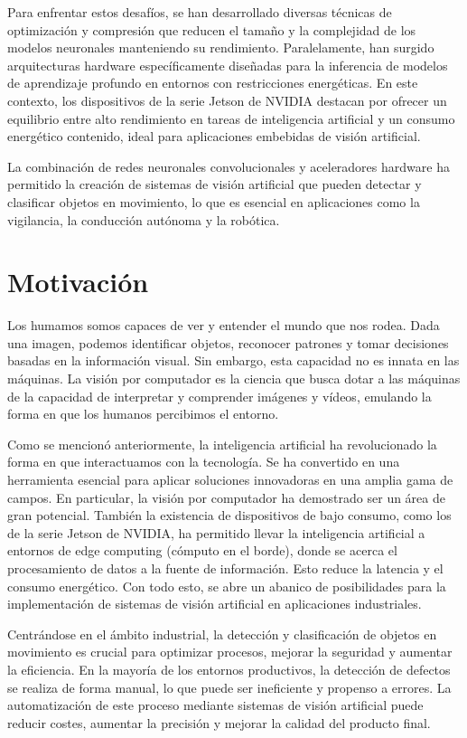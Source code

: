 \documentclass[11pt,spanish,listoffigures,listoftables]{tfgetsinf}
\begin{document}
Para enfrentar estos desafíos, se han desarrollado diversas técnicas de optimización y compresión que reducen el tamaño y la complejidad de los modelos neuronales manteniendo su rendimiento. Paralelamente, han surgido arquitecturas hardware específicamente diseñadas para la inferencia de modelos de aprendizaje profundo en entornos con restricciones energéticas. En este contexto, los dispositivos de la serie Jetson de NVIDIA\cite{nvidia_jetson_modules} destacan por ofrecer un equilibrio entre alto rendimiento en tareas de inteligencia artificial y un consumo energético contenido, ideal para aplicaciones embebidas de visión artificial.

La combinación de redes neuronales convolucionales y aceleradores hardware ha permitido la creación de sistemas de visión artificial que pueden detectar y clasificar objetos en movimiento, lo que es esencial en aplicaciones como la vigilancia, la conducción autónoma y la robótica.

\section{Motivaci\'on} \label{sec:motivacion}

Los humamos somos capaces de ver y entender el mundo que nos rodea. Dada una imagen, podemos identificar objetos, reconocer patrones y tomar decisiones basadas en la información visual. Sin embargo, esta capacidad no es innata en las máquinas. La visión por computador es la ciencia que busca dotar a las máquinas de la capacidad de interpretar y comprender imágenes y vídeos, emulando la forma en que los humanos percibimos el entorno. 

Como se mencionó anteriormente, la inteligencia artificial ha revolucionado la forma en que interactuamos con la tecnología. Se ha convertido en una herramienta esencial para aplicar soluciones innovadoras en una amplia gama de campos. En particular, la visión por computador ha demostrado ser un área de gran potencial. También la existencia de dispositivos de bajo consumo, como los de la serie Jetson de NVIDIA, ha permitido llevar la inteligencia artificial a entornos de edge computing (cómputo en el borde), donde se acerca el procesamiento de datos a la fuente de información. Esto reduce la latencia y el consumo energético. Con todo esto, se abre un abanico de posibilidades para la implementación de sistemas de visión artificial en aplicaciones industriales.

Centrándose en el ámbito industrial, la detección y clasificación de objetos en movimiento es crucial para optimizar procesos, mejorar la seguridad y aumentar la eficiencia. En la mayoría de los entornos productivos, la detección de defectos se realiza de forma manual, lo que puede ser ineficiente y propenso a errores. La automatización de este proceso mediante sistemas de visión artificial puede reducir costes, aumentar la precisión y mejorar la calidad del producto final.
\end{document}
